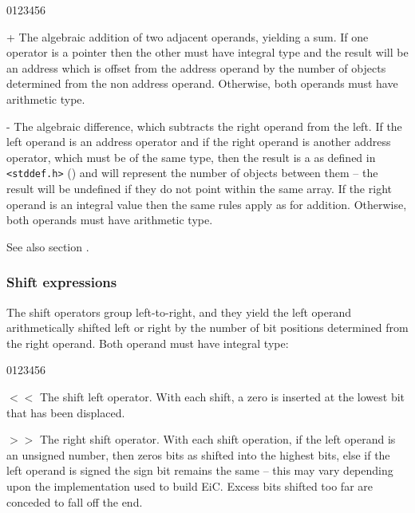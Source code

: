 \begin{production}
\begin{Ventry3}{0123456}
\item[+]  The algebraic addition of two adjacent operands, yielding a
           sum.  If one operator is a pointer then the other must have
           integral type and the result will be an address which is
           offset from the address operand by the number of objects
           determined from the non address operand. Otherwise, both
           operands must have arithmetic type.

\item[-] The algebraic difference, which subtracts the right operand from 
          the left. If the left operand is an address operator and if
          the right operand is another address operator, which must be
          of the same type, then the result is a  as defined
          in \verb+<stddef.h>+ () and will
          represent the number of objects between them -- the result
          will be undefined if they do not point within the same
          array. If the right operand is an integral value then the
          same rules apply as for addition. Otherwise, both operands
          must have arithmetic type.
\end{Ventry3}
\end{production}

See also section .


\subsubsection{Shift expressions}
\label{sec:ShiftExpression}

The shift operators group left-to-right, and they yield the left
operand arithmetically shifted left or right by the number of bit
positions determined from the right operand. Both operand must
have integral type:

\begin{production}
\end{production}

\begin{production}
\begin{Ventry3}{0123456}
\item[$<<$] The shift left operator.  With each shift, a zero is 
            inserted at the lowest bit that has been displaced.
\item[$>>$] The right shift operator. With each shift operation, if the 
        left operand is an unsigned number, then zeros bits as shifted
        into the highest bits, else if the left operand is signed the
        sign bit remains the same -- this may vary depending upon the
        implementation used to build EiC. Excess bits shifted too far
        are conceded to fall off the end.
\end{Ventry3}
\end{production}

